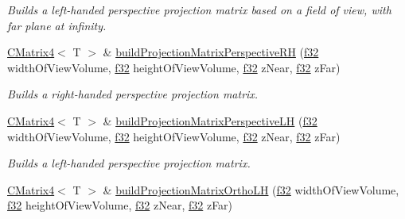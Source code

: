 \begin{DoxyCompactItemize}
\begin{DoxyCompactList}\small\item\em Builds a left-\/handed perspective projection matrix based on a field of view, with far plane at infinity. \end{DoxyCompactList}\item 
\mbox{\label{classirr_1_1core_1_1CMatrix4_a4cceca850e14e69b0139d2c0d5da9fb1}} 
\hyperlink{classirr_1_1core_1_1CMatrix4}{C\+Matrix4}$<$ T $>$ \& \hyperlink{classirr_1_1core_1_1CMatrix4_a4cceca850e14e69b0139d2c0d5da9fb1}{build\+Projection\+Matrix\+Perspective\+RH} (\hyperlink{namespaceirr_a0277be98d67dc26ff93b1a6a1d086b07}{f32} width\+Of\+View\+Volume, \hyperlink{namespaceirr_a0277be98d67dc26ff93b1a6a1d086b07}{f32} height\+Of\+View\+Volume, \hyperlink{namespaceirr_a0277be98d67dc26ff93b1a6a1d086b07}{f32} z\+Near, \hyperlink{namespaceirr_a0277be98d67dc26ff93b1a6a1d086b07}{f32} z\+Far)
\begin{DoxyCompactList}\small\item\em Builds a right-\/handed perspective projection matrix. \end{DoxyCompactList}\item 
\mbox{\label{classirr_1_1core_1_1CMatrix4_a877fee0f391fa7f2d56a2e16d955b2c9}} 
\hyperlink{classirr_1_1core_1_1CMatrix4}{C\+Matrix4}$<$ T $>$ \& \hyperlink{classirr_1_1core_1_1CMatrix4_a877fee0f391fa7f2d56a2e16d955b2c9}{build\+Projection\+Matrix\+Perspective\+LH} (\hyperlink{namespaceirr_a0277be98d67dc26ff93b1a6a1d086b07}{f32} width\+Of\+View\+Volume, \hyperlink{namespaceirr_a0277be98d67dc26ff93b1a6a1d086b07}{f32} height\+Of\+View\+Volume, \hyperlink{namespaceirr_a0277be98d67dc26ff93b1a6a1d086b07}{f32} z\+Near, \hyperlink{namespaceirr_a0277be98d67dc26ff93b1a6a1d086b07}{f32} z\+Far)
\begin{DoxyCompactList}\small\item\em Builds a left-\/handed perspective projection matrix. \end{DoxyCompactList}\item 
\mbox{\label{classirr_1_1core_1_1CMatrix4_a12c2f096eb8d6508e0a268ec74eaa4bc}} 
\hyperlink{classirr_1_1core_1_1CMatrix4}{C\+Matrix4}$<$ T $>$ \& \hyperlink{classirr_1_1core_1_1CMatrix4_a12c2f096eb8d6508e0a268ec74eaa4bc}{build\+Projection\+Matrix\+Ortho\+LH} (\hyperlink{namespaceirr_a0277be98d67dc26ff93b1a6a1d086b07}{f32} width\+Of\+View\+Volume, \hyperlink{namespaceirr_a0277be98d67dc26ff93b1a6a1d086b07}{f32} height\+Of\+View\+Volume, \hyperlink{namespaceirr_a0277be98d67dc26ff93b1a6a1d086b07}{f32} z\+Near, \hyperlink{namespaceirr_a0277be98d67dc26ff93b1a6a1d086b07}{f32} z\+Far)

\end{DoxyCompactItemize}
